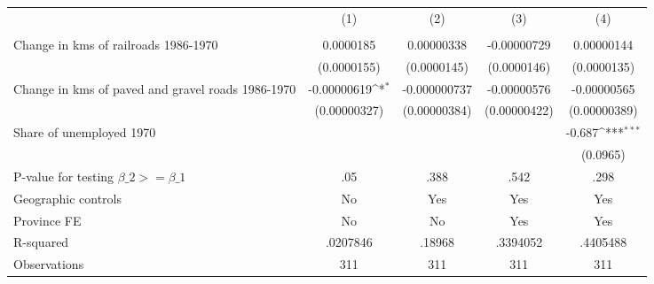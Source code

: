 {
\def\sym#1{\ifmmode^{#1}\else\(^{#1}\)\fi}
\begin{tabular}{l*{4}{c}}
\hline\hline
                &\multicolumn{1}{c}{(1)}&\multicolumn{1}{c}{(2)}&\multicolumn{1}{c}{(3)}&\multicolumn{1}{c}{(4)}\\
                &\multicolumn{1}{c}{}&\multicolumn{1}{c}{}&\multicolumn{1}{c}{}&\multicolumn{1}{c}{}\\
\hline
Change in kms of railroads 1986-1970&0.0000185         &0.00000338         &-0.00000729         &0.00000144         \\
                &(0.0000155)         &(0.0000145)         &(0.0000146)         &(0.0000135)         \\
[1em]
Change in kms of paved and gravel roads 1986-1970&-0.00000619\sym{*}  &-0.000000737         &-0.00000576         &-0.00000565         \\
                &(0.00000327)         &(0.00000384)         &(0.00000422)         &(0.00000389)         \\
[1em]
Share of unemployed 1970&                  &                  &                  &   -0.687\sym{***}\\
                &                  &                  &                  & (0.0965)         \\
\hline
P-value for testing $\beta\_{2} >= \beta\_{1}$&      .05         &     .388         &     .542         &     .298         \\
Geographic controls&       No         &      Yes         &      Yes         &      Yes         \\
Province FE     &       No         &       No         &      Yes         &      Yes         \\
R-squared       & .0207846         &   .18968         & .3394052         & .4405488         \\
Observations    &      311         &      311         &      311         &      311         \\
\hline\hline
\end{tabular}
}
